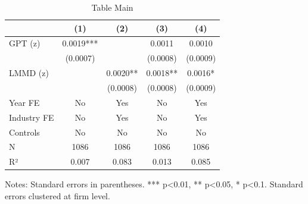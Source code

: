 \begin{table}[htbp]
\centering
\caption{Table Main}
\label{tab:table_main}
\begin{tabular}{lcccc}
\toprule
 & (1) & (2) & (3) & (4) \\
\midrule
GPT (z) & 0.0019*** &  & 0.0011 & 0.0010 \\
  & (0.0007) &  & (0.0008) & (0.0009) \\
LMMD (z) &  & 0.0020** & 0.0018** & 0.0016* \\
  &  & (0.0008) & (0.0008) & (0.0009) \\
Year FE & No & Yes & No & Yes \\
Industry FE & No & Yes & No & Yes \\
Controls & No & No & No & No \\
N & 1086 & 1086 & 1086 & 1086 \\
R² & 0.007 & 0.083 & 0.013 & 0.085 \\
\bottomrule
\end{tabular}
\begin{flushleft}
\footnotesize Notes: Standard errors in parentheses. *** p<0.01, ** p<0.05, * p<0.1. Standard errors clustered at firm level.
\end{flushleft}
\end{table}